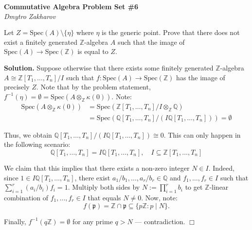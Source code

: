 \documentclass{template}
\newcommand{\qedwhite}{\hfill \ensuremath{\Box}}
\begin{document}
\begin{center}
    \Large \textcolor{blue!70!black}{\textbf{Commutative Algebra Problem Set \#6}} \\
    \normalsize \textit{Dmytro Zakharov}
\end{center}

\begin{problem}[Exercise 1]
    Let $Z = \text{Spec}(A) \setminus \{\eta\}$ where $\eta$ is the generic
    point. Prove that there does not exist a finitely generated
    $\mathbb{Z}$-algebra $A$ such that the image of $\text{Spec}(A) \to
    \text{Spec}(\mathbb{Z})$ is equal to $Z$.
\end{problem}

\textbf{Solution.} Suppose otherwise that there exists some finitely generated
$\mathbb{Z}$-algebra $A \cong \mathbb{Z}[T_1,\dots,T_n]/I$ such that $f:
\text{Spec}(A) \to \text{Spec}(\mathbb{Z})$ has the image of precisely $Z$. Note
that by the problem statement, $f^{-1}(\eta) = \emptyset = \text{Spec}(A
\otimes_{\mathbb{Z}} \kappa(0))$. Note:
\begin{align*}
    \text{Spec}(A \otimes_{\mathbb{Z}} \kappa(0)) &= \text{Spec}(\mathbb{Z}[T_1,\dots,T_n]/I \otimes_{\mathbb{Z}} \mathbb{Q})
    \\ &= \text{Spec}(\mathbb{Q}[T_1,\dots,T_n]/(I\mathbb{Q}[T_1,\dots,T_n])) =\emptyset
\end{align*}

Thus, we obtain $\mathbb{Q}[T_1,\dots,T_n]/(I\mathbb{Q}[T_1,\dots,T_n]) \cong
0$. This can only happen in the following scenario:
\begin{equation*}
    \mathbb{Q}[T_1,\dots,T_n] = I\mathbb{Q}[T_1,\dots,T_n], \quad I \subseteq \mathbb{Z}[T_1,\dots,T_n]
\end{equation*}

We claim that this implies that there exists a non-zero integer $N \in I$.
Indeed, since $1 \in I\mathbb{Q}[T_1,\dots,T_n]$, there exist
$a_1/b_1,\dots,a_r/b_r \in \mathbb{Q}$ and $f_1,\dots,f_r \in I$
such that $\sum_{i=1}^r (a_i/b_i)f_i = 1$. Multiply both sides by $N :=
\prod_{i=1}^r b_i$ to get $\mathbb{Z}$-linear combination of $f_1,\dots,f_r \in
I$ that equals $N \neq 0$. Now, note:
\begin{equation*}
    f(\mathfrak{p}) = \mathbb{Z} \cap \mathfrak{p} \subseteq \{p\mathbb{Z}: p \mid N\}.
\end{equation*}

Finally, $f^{-1}(q\mathbb{Z}) = \emptyset$ for any prime $q>N$ --- contradiction. \qedwhite
\end{document}
